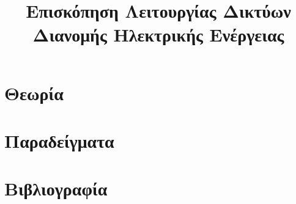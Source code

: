 \title{Επισκόπηση Λειτουργίας Δικτύων Διανομής Ηλεκτρικής Ενέργειας}

\section{Θεωρία}
\label{kef-04-theoria}

\section{Παραδείγματα}
\label{kef-04-paradeigmata}

\section{Βιβλιογραφία}
\label{kef-04-vivliografia}

